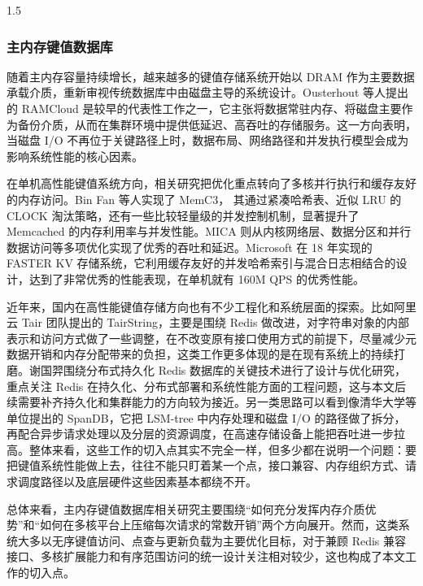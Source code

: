 \documentclass[a4paper,12pt,fontset=none,twoside]{article}
\numberwithin{figure}{section}
\numberwithin{equation}{section}
\numberwithin{table}{section}
\begin{document}
\begin{spacing}{1.5}
	\subsubsection{主内存键值数据库}
	随着主内存容量持续增长，越来越多的键值存储系统开始以 DRAM 作为主要数据承载介质，重新审视传统数据库中由磁盘主导的系统设计。Ousterhout 等人提出的 RAMCloud 是较早的代表性工作之一，它主张将数据常驻内存、将磁盘主要作为备份介质，从而在集群环境中提供低延迟、高吞吐的存储服务\cite{The-Case-for-RAMClouds-Scalable-High-Performance-Storage-Entirely-in-DRAM}。这一方向表明，当磁盘 I/O 不再位于关键路径上时，数据布局、网络路径和并发执行模型会成为影响系统性能的核心因素。

	在单机高性能键值系统方向，相关研究把优化重点转向了多核并行执行和缓存友好的内存访问。Bin Fan 等人实现了 MemC3\cite{MemC3-Compact-and-Concurrent-MemCache-with-Dumber-Caching-and-Smarter-Hashing}， 其通过紧凑哈希表、近似 LRU 的 CLOCK 淘汰策略，还有一些比较轻量级的并发控制机制，显著提升了 Memcached 的内存利用率与并发性能。MICA\cite{MICA-A-Holistic-Approach-to-Fast-In-Memory-Key-Value-Storage} 则从内核网络层、数据分区和并行数据访问等多项优化实现了优秀的吞吐和延迟。Microsoft 在 18 年实现的 FASTER\cite{FASTER-A-Concurrent-Key-Value-Store-with-In-Place-Updates} KV 存储系统，它利用缓存友好的并发哈希索引与混合日志相结合的设计，达到了非常优秀的性能表现，在单机就有 160M QPS 的优秀性能。

	近年来，国内在高性能键值存储方向也有不少工程化和系统层面的探索。比如阿里云 Tair 团队提出的 TairString\cite{TairString}，主要是围绕 Redis 做改进，对字符串对象的内部表示和访问方式做了一些调整，在不改变原有接口使用方式的前提下，尽量减少元数据开销和内存分配带来的负担，这类工作更多体现的是在现有系统上的持续打磨。谢国羿围绕分布式持久化 Redis 数据库的关键技术进行了设计与优化研究，重点关注 Redis 在持久化、分布式部署和系统性能方面的工程问题\cite{Xie2025RedisPersistence}，这与本文后续需要补齐持久化和集群能力的方向较为接近。另一类思路可以看到像清华大学等单位提出的 SpanDB\cite{SpanDB}，它把 LSM-tree 中内存处理和磁盘 I/O 的路径做了拆分，再配合异步请求处理以及分层的资源调度，在高速存储设备上能把吞吐进一步拉高。整体来看，这些工作的切入点其实不完全一样，但多少都在说明一个问题：要把键值系统性能做上去，往往不能只盯着某一个点，接口兼容、内存组织方式、请求调度路径以及底层硬件这些因素基本都绕不开。

	总体来看，主内存键值数据库相关研究主要围绕“如何充分发挥内存介质优势”和“如何在多核平台上压缩每次请求的常数开销”两个方向展开。然而，这类系统大多以无序键值访问、点查与更新负载为主要优化目标，对于兼顾 Redis 兼容接口、多核扩展能力和有序范围访问的统一设计关注相对较少，这也构成了本文工作的切入点。

\end{spacing}
\end{document}
